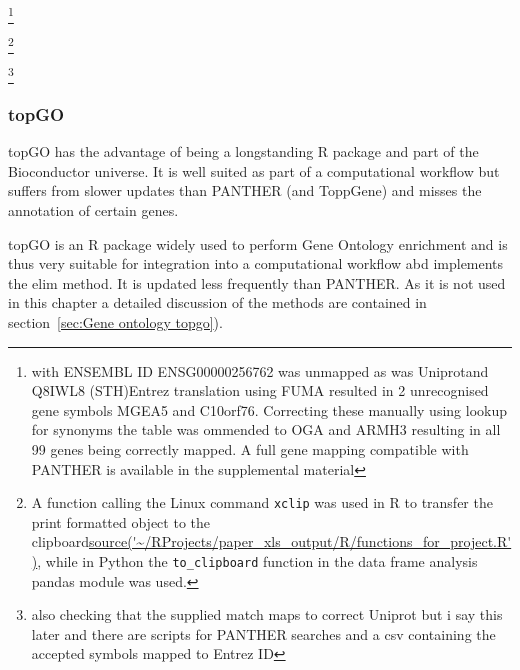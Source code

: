     \footnote{with ENSEMBL ID ENSG00000256762 was unmapped as was Uniprotand Q8IWL8 (STH)Entrez translation using FUMA resulted in 2 unrecognised gene symbols MGEA5 and C10orf76. Correcting these manually using lookup for synonyms the table was ommended to OGA and ARMH3 resulting in all 99 genes being correctly mapped. A full gene mapping compatible with PANTHER is available in the supplemental material}
    
    
    
    
\footnote{A function calling the Linux command \texttt{xclip} was used in R to transfer the print formatted object to the clipboard\url{source('~/RProjects/paper_xls_output/R/functions_for_project.R')}, while in Python the \texttt{to\_clipboard} function in the data frame analysis pandas module was used\cite{mckinney2011pandas}.} 

\footnote{also checking that the supplied match maps to correct Uniprot but i say this later and there are scripts for PANTHER searches and a csv containing the accepted symbols mapped to Entrez ID}



 \subsubsection{topGO}
\label{sec:toponto GO enrichment preliminary}
 topGO has the advantage of being a longstanding R package and part of the Bioconductor\cite{gentleman2004bioconductor} universe. It is well suited as part of a computational workflow but suffers from slower updates than PANTHER (and ToppGene) and misses the annotation of certain genes. 


topGO is an R package widely used to perform Gene Ontology enrichment and is thus very suitable for integration into a computational workflow abd implements the elim method. It is updated less frequently than PANTHER. As it is not used in this chapter a detailed discussion of the methods are contained in section~\ref{sec:Gene ontology topgo}). 
